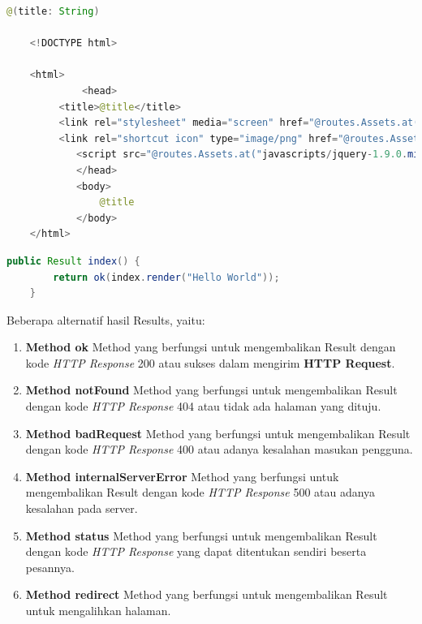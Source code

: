 \begin{lstlisting}[caption=Contoh View,label = {lst_2_view},language=Java]
@(title: String)

	<!DOCTYPE html>

	<html>
    		 <head>
       	 <title>@title</title>
       	 <link rel="stylesheet" media="screen" href="@routes.Assets.at("stylesheets/main.css")">
       	 <link rel="shortcut icon" type="image/png" href="@routes.Assets.at("images/favicon.png")">
        	<script src="@routes.Assets.at("javascripts/jquery-1.9.0.min.js")" type="text/javascript"></script>
    		</head>
    		<body>
        		@title
    		</body>
	</html>
\end{lstlisting}


\begin{lstlisting}[caption=Contoh Controller,label = {lst_2_controller},language=Java]
	public Result index() {
        return ok(index.render("Hello World"));
    }
\end{lstlisting}

Beberapa alternatif hasil Results, yaitu:
\begin{enumerate}
	\item \textbf{Method ok} 
	Method yang berfungsi untuk mengembalikan Result dengan kode \textit{HTTP Response} 200 atau sukses dalam mengirim \textbf{HTTP Request}.
	\item \textbf{Method notFound} 
	Method yang berfungsi untuk mengembalikan Result dengan  kode \textit{HTTP Response} 404 atau tidak ada halaman yang dituju.
	\item \textbf{Method badRequest} 
	Method yang berfungsi untuk mengembalikan Result dengan kode \textit{HTTP Response} 400 atau adanya kesalahan masukan pengguna.
	\item \textbf{Method internalServerError}
	Method yang berfungsi untuk mengembalikan Result dengan kode \textit{HTTP Response} 500 atau adanya kesalahan pada server.
	\item \textbf{Method status}
	Method yang berfungsi untuk mengembalikan Result dengan kode \textit{HTTP Response} yang dapat ditentukan sendiri beserta pesannya.
	\item \textbf{Method redirect}
	Method yang berfungsi untuk mengembalikan Result untuk mengalihkan halaman.
\end{enumerate}

